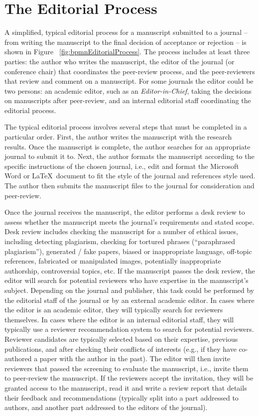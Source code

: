 \documentclass{article}
\begin{document}
\section{The Editorial Process}

A simplified, typical editorial process for a manuscript submitted to a journal -- from writing the manuscript to the final decision of
acceptance or rejection -- is shown in Figure ~\ref{fig:bpmnEditorialProcess}. The process includes at least three parties: the author who
writes the manuscript, the editor of the journal (or conference chair) that coordinates the peer-review process, and the peer-reviewers
that review and comment on a manuscript. For some journals the editor could be two persons: an academic editor, such as an \textit{Editor-in-Chief},
taking the decisions on manuscripts after peer-review, and an internal editorial staff coordinating the editorial process.

The typical editorial process involves several steps that must be completed in a particular order. First, the author writes the manuscript
with the research results. Once the manuscript is complete, the author searches for an appropriate journal to submit it to. Next, the author
formats the manuscript according to the specific instructions of the chosen journal, i.e., edit and format the Microsoft Word or \LaTeX~document
to fit the style of the journal and references style used. The author then submits the manuscript files to the journal for consideration and
peer-review. 

Once the journal receives the manuscript, the editor performs a desk review to assess whether the manuscript meets the journal's requirements
and stated scope. Desk review includes checking the manuscript for a number of ethical issues, including detecting plagiarism, checking for tortured
phrases (``paraphrased plagiarism''), generated / fake papers, biased or inappropriate language, off-topic references, fabricated or manipulated
images, potentially inappropriate authorship, controversial topics, etc. If the manuscript passes the desk review, the editor will search for potential
reviewers who have expertise in the manuscript's subject. Depending on the journal and publisher, this task could be performed by the editorial staff of
the journal or by an external academic editor. In cases where the editor is an academic editor, they will typically search for reviewers
themselves. In cases where the editor is an internal editorial staff, they will typically use a reviewer recommendation system to search
for potential reviewers. Reviewer candidates are typically selected based on their expertise, previous publications, and after checking 
their conflicts of interests (e.g., if they have co-authored a paper with the author in the past). The editor will then invite reviewers
that passed the screening to evaluate the manuscript, i.e., invite them to peer-review the manuscript. If the reviewers accept the invitation,
they will be granted access to the manuscript, read it and write a review report that details their feedback and recommendations (typically
split into a part addressed to authors, and another part addressed to the editors of the journal). 
\end{document}
